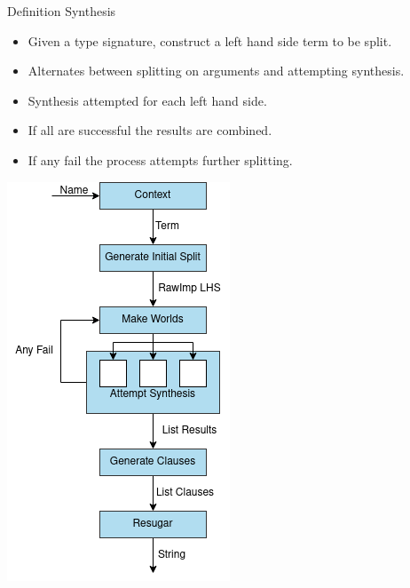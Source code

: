 \documentclass[presentation]{beamer}
\begin{document}
\begin{frame}[fragile]{Definition Synthesis}

\begin{multicols}{2}
  \begin{itemize}
  \item Given a type signature, construct a left hand side term to be split.
  \item Alternates between splitting on arguments and attempting synthesis. 
  \item Synthesis attempted for each left hand side.
  \item If all are successful the results are combined.
  \item If any fail the process attempts further splitting.
  \end{itemize}

  \includegraphics[scale=0.4]{Resource/worlds.png} 
\end{multicols}
\end{frame}
\end{document}
